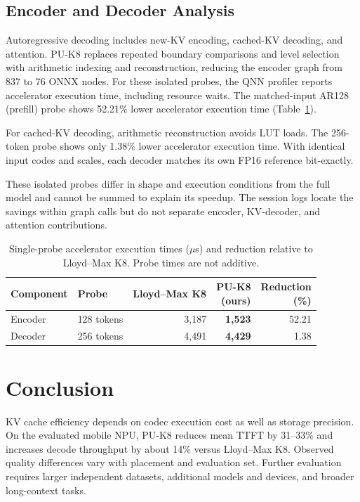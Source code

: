 \documentclass[conference,a4paper,10pt]{IEEEtran}
\begin{document}
\subsection{Encoder and Decoder Analysis}
Autoregressive decoding includes new-KV encoding, cached-KV decoding, and attention. PU-K8 replaces repeated boundary comparisons and level selection with arithmetic indexing and reconstruction, reducing the encoder graph from 837 to 76 ONNX nodes. For these isolated probes, the QNN profiler reports accelerator execution time, including resource waits. The matched-input AR128 (prefill) probe shows 52.21\% lower accelerator execution time (Table~\ref{tab:codec-costs}).

For cached-KV decoding, arithmetic reconstruction avoids LUT loads. The 256-token probe shows only 1.38\% lower accelerator execution time. With identical input codes and scales, each decoder matches its own FP16 reference bit-exactly.

These isolated probes differ in shape and execution conditions from the full model and cannot be summed to explain its speedup. The session logs locate the savings within graph calls but do not separate encoder, KV-decoder, and attention contributions.

\begin{table}[!ht]
\caption{Single-probe accelerator execution times ($\mu$s) and reduction relative to Lloyd--Max K8. Probe times are not additive.}
\label{tab:codec-costs}
\centering
\setlength{\tabcolsep}{4pt}
\begin{tabular}{@{}llrrr@{}}
\toprule
Component & Probe & Lloyd--Max K8 & \shortstack{PU-K8\\(ours)} & \shortstack{Reduction\\(\%)}\\
\midrule
Encoder & 128 tokens & 3,187 & \textbf{1,523} & 52.21\\
Decoder & 256 tokens & 4,491 & \textbf{4,429} & 1.38\\
\bottomrule
\end{tabular}
\end{table}

\raggedend
\newpage
\section{Conclusion}

KV cache efficiency depends on codec execution cost as well as storage precision. On the evaluated mobile NPU, PU-K8 reduces mean TTFT by 31--33\% and increases decode throughput by about 14\% versus Lloyd--Max K8. Observed quality differences vary with placement and evaluation set. Further evaluation requires larger independent datasets, additional models and devices, and broader long-context tasks.
\end{document}
